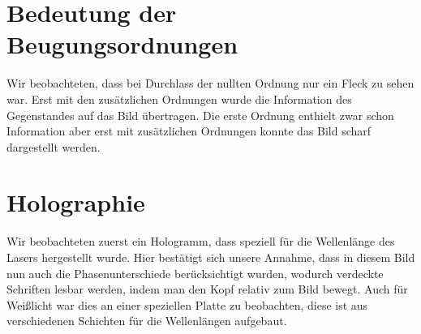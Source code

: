\documentclass[ngerman, parskip*]{scrartcl}
\begin{document}
\section{Bedeutung der Beugungsordnungen}
Wir beobachteten, dass bei Durchlass der nullten Ordnung nur ein Fleck zu sehen war. Erst mit den zusätzlichen Ordnungen wurde die Information des Gegenstandes auf das Bild übertragen. Die erste Ordnung enthielt zwar schon Information aber erst mit zusätzlichen Ordnungen konnte das Bild scharf dargestellt werden.
\section{Holographie}
Wir beobachteten zuerst ein Hologramm, dass speziell für die Wellenlänge des Lasers hergestellt wurde. Hier bestätigt sich unsere Annahme, dass in diesem Bild nun auch die Phasenunterschiede berücksichtigt wurden, wodurch verdeckte Schriften lesbar werden, indem man den Kopf relativ zum Bild bewegt. Auch für Weißlicht war dies an einer speziellen Platte zu beobachten, diese ist aus verschiedenen Schichten für die Wellenlängen aufgebaut.
\end{document}
